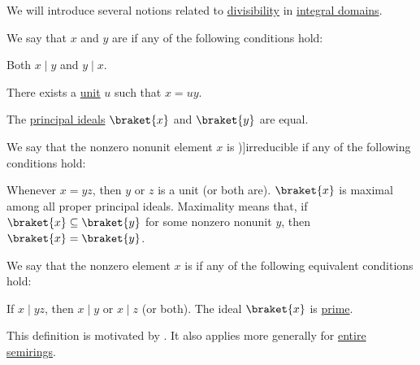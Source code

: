 \begin{definition}\label{def:domain_divisibility}
  We will introduce several notions related to \hyperref[def:divisibility]{divisibility} in \hyperref[def:integral_domain]{integral domains}.

  \begin{thmenum}
     We say that \( x \) and \( y \) are  if any of the following conditions hold:
    \begin{thmenum}
       Both \( x \mid y \) and \( y \mid x \).

       There exists a \hyperref[def:divisibility/unit]{unit} \( u \) such that \( x = uy \).

       The \hyperref[def:semiring_ideal/principal]{principal ideals} \( \braket{ x } \) and \( \braket{ y } \) are equal.
    \end{thmenum}

     We say that the nonzero nonunit element \( x \) is \term[bg=неразложим (\cite[def. II.3]{ГеновМиховскиМоллов1991})]{irreducible} if any of the following conditions hold:
    \begin{thmenum}
       Whenever \( x = yz \), then \( y \) or \( z \) is a unit (or both are).
       \( \braket{ x } \) is maximal among all proper principal ideals. Maximality means that, if \( \braket{ x } \subseteq \braket{ y } \) for some nonzero nonunit \( y \), then \( \braket{ x } = \braket{ y } \).
    \end{thmenum}

     We say that the nonzero element \( x \) is  if any of the following equivalent conditions hold:
    \begin{thmenum}
       If \( x \mid yz \), then \( x \mid y \) or \( x \mid z \) (or both).
       The ideal \( \braket{ x } \) is \hyperref[def:semiring_ideal/prime]{prime}.
    \end{thmenum}

    This definition is motivated by . It also applies more generally for \hyperref[def:entire_semiring]{entire semirings}.
  \end{thmenum}
\end{definition}
